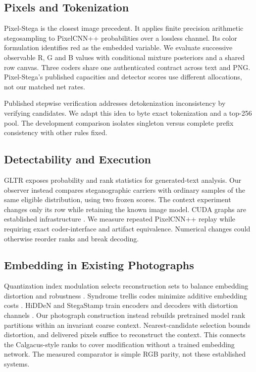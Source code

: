 \documentclass[a4paper,twoside]{article}
\begin{document}
\subsection{Pixels and Tokenization}
Pixel-Stega \cite{pixelstega} is the closest image precedent. It applies finite precision arithmetic stegosampling to PixelCNN++ probabilities over a lossless channel. Its color formulation identifies red as the embedded variable. We evaluate successive observable R, G and B values with conditional mixture posteriors and a shared row canvas. Three coders share one authenticated contract across text and PNG. Pixel-Stega's published capacities and detector scores use different allocations, not our matched net rates.

Published stepwise verification \cite{consistency} addresses detokenization inconsistency by verifying candidates. We adapt this idea to byte exact tokenization and a top-256 pool. The development comparison isolates singleton versus complete prefix consistency with other rules fixed.

\subsection{Detectability and Execution}
GLTR \cite{gltr} exposes probability and rank statistics for generated-text analysis. Our observer instead compares steganographic carriers with ordinary samples of the same eligible distribution, using two frozen scores. The context experiment changes only its row while retaining the known image model.
CUDA graphs are established infrastructure \cite{pytorchgraphs}. We measure repeated PixelCNN++ replay while requiring exact coder-interface and artifact equivalence. Numerical changes could otherwise reorder ranks and break decoding.

\subsection{Embedding in Existing Photographs}
Quantization index modulation selects reconstruction sets to balance embedding distortion and robustness \cite{qim}. Syndrome trellis codes minimize additive embedding costs \cite{stc}. HiDDeN and StegaStamp train encoders and decoders with distortion channels \cite{hidden,stegastamp}. Our photograph construction instead rebuilds pretrained model rank partitions within an invariant coarse context. Nearest-candidate selection bounds distortion, and delivered pixels suffice to reconstruct the context. This connects the Calgacus-style ranks to cover modification without a trained embedding network. The measured comparator is simple RGB parity, not these established systems.
\end{document}
